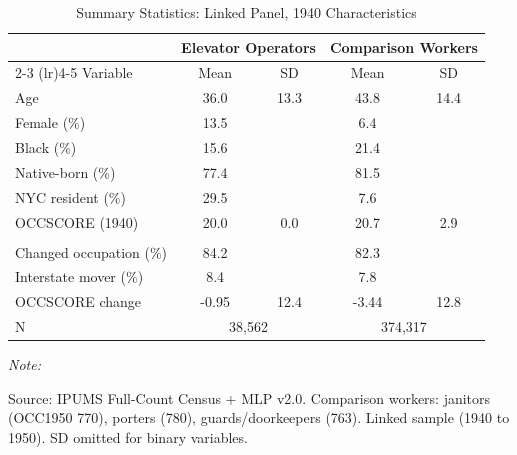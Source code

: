 \begin{table}[!h]
\centering
\caption{Summary Statistics: Linked Panel, 1940 Characteristics}
\begin{threeparttable}
\begin{tabular}[t]{lcccc}
\toprule
 & \multicolumn{2}{c}{Elevator Operators} & \multicolumn{2}{c}{Comparison Workers} \\
\cmidrule(lr){2-3} \cmidrule(lr){4-5}
Variable & Mean & SD & Mean & SD \\
\midrule
Age & 36.0 & 13.3 & 43.8 & 14.4 \\
Female (\%) & 13.5 & & 6.4 & \\
Black (\%) & 15.6 & & 21.4 & \\
Native-born (\%) & 77.4 & & 81.5 & \\
NYC resident (\%) & 29.5 & & 7.6 & \\
OCCSCORE (1940) & 20.0 & 0.0 & 20.7 & 2.9 \\
\addlinespace
\multicolumn{5}{l}{\textit{1950 Outcomes}} \\
Changed occupation (\%) & 84.2 & & 82.3 & \\
Interstate mover (\%) & 8.4 & & 7.8 & \\
OCCSCORE change & -0.95 & 12.4 & -3.44 & 12.8 \\
\addlinespace
N & \multicolumn{2}{c}{38,562} & \multicolumn{2}{c}{374,317} \\
\bottomrule
\end{tabular}
\begin{tablenotes}
\item \textit{Note: }
\item Source: IPUMS Full-Count Census + MLP v2.0. Comparison workers: janitors (OCC1950 770), porters (780), guards/doorkeepers (763). Linked sample (1940 to 1950). SD omitted for binary variables.
\end{tablenotes}
\end{threeparttable}
\end{table}